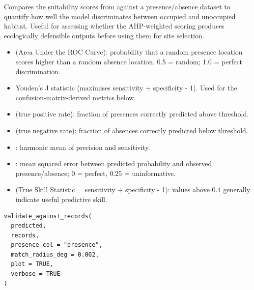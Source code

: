 \documentclass[a4paper]{book}
\begin{document}
\begin{Description}
Compares the suitability scores from  against a
presence/absence dataset to quantify how well the model discriminates
between occupied and unoccupied habitat. Useful for assessing whether the
AHP-weighted scoring produces ecologically defensible outputs before using
them for site selection.

\begin{itemize}

\item{}  (Area Under the ROC Curve): probability that a random presence
location scores higher than a random absence location. 0.5 = random;
1.0 = perfect discrimination.
\item{}  Youden's J statistic (maximises sensitivity +
specificity - 1). Used for the confusion-matrix-derived metrics below.
\item{}  (true positive rate): fraction of presences correctly
predicted above threshold.
\item{}  (true negative rate): fraction of absences correctly
predicted below threshold.
\item{} : harmonic mean of precision and sensitivity.
\item{} : mean squared error between predicted probability and
observed presence/absence; 0 = perfect, 0.25 = uninformative.
\item{}  (True Skill Statistic = sensitivity + specificity - 1): values
above 0.4 generally indicate useful predictive skill.

\end{itemize}

\end{Description}
%
\begin{Usage}
\begin{verbatim}
validate_against_records(
  predicted,
  records,
  presence_col = "presence",
  match_radius_deg = 0.002,
  plot = TRUE,
  verbose = TRUE
)
\end{verbatim}
\end{Usage}
%
\end{document}
